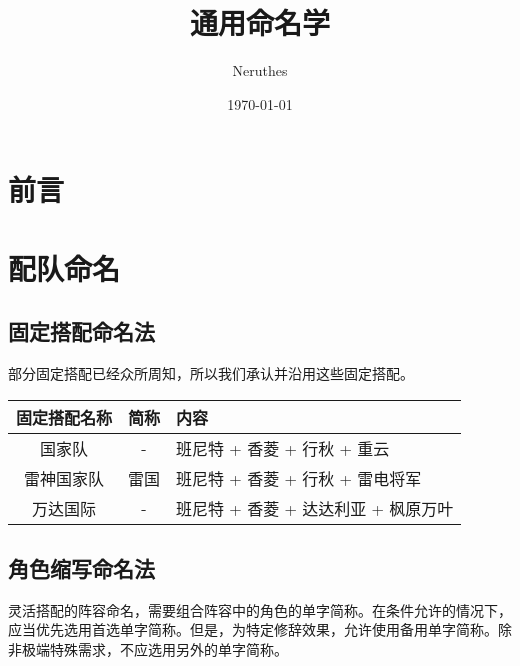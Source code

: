 \documentclass[a4paper,11pt]{report}
\title{通用命名学}
\author{Neruthes}
\date{\today}
\begin{document}
\tabulinesep=6pt
\parindent=0pt
\parskip=5pt

\begin{titlepage}
	\maketitle
\end{titlepage}

\setcounter{tocdepth}{1}
\tableofcontents

\chapter*{前言}


\chapter{配队命名}

\section{固定搭配命名法}

部分固定搭配已经众所周知，所以我们承认并沿用这些固定搭配。

\begin{longtabu}{|c|c|X[c]|}
	\hline
	{固定搭配名称} & {简称} & {内容} \\
	\hline
	\endhead
	{国家队} & {-} & {班尼特 + 香菱 + 行秋 + 重云} \\
	{雷神国家队} & {雷国} & {班尼特 + 香菱 + 行秋 + 雷电将军} \\
	{万达国际} & {-} & {班尼特 + 香菱 + 达达利亚 + 枫原万叶} \\
	\hline
\end{longtabu}

\section{角色缩写命名法}

灵活搭配的阵容命名，需要组合阵容中的角色的单字简称。在条件允许的情况下，应当优先选用首选单字简称。但是，为特定修辞效果，允许使用备用单字简称。除非极端特殊需求，不应选用另外的单字简称。
\end{document}
